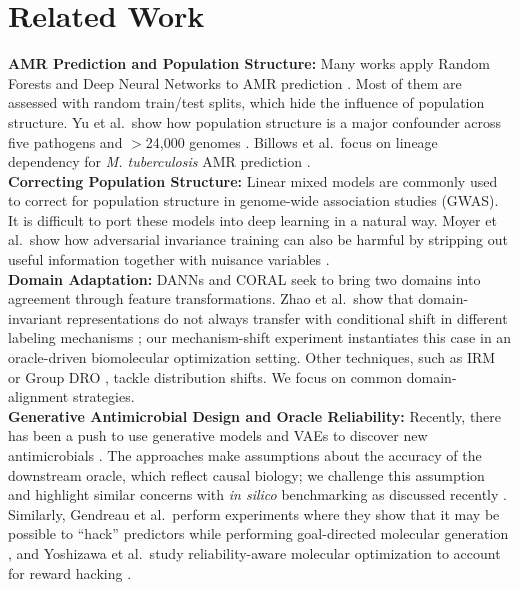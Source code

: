\documentclass{article}
\begin{document}
\section{Related Work}
\textbf{AMR Prediction and Population Structure:} Many works apply Random Forests and Deep Neural Networks to AMR prediction \cite{moradigaravand2018prediction}. Most of them are assessed with random train/test splits, which hide the influence of population structure. Yu et al.\ show how population structure is a major confounder across five pathogens and $>$24,000 genomes \cite{yu2025population}. Billows et al.\ focus on lineage dependency for \textit{M. tuberculosis} AMR prediction \cite{billows2023mtb}. \\
\textbf{Correcting Population Structure:} Linear mixed models \cite{earle2016identifying, lees2018pyseer} are commonly used to correct for population structure in genome-wide association studies (GWAS). It is difficult to port these models into deep learning in a natural way. Moyer et al.\ show how adversarial invariance training can also be harmful by stripping out useful information together with nuisance variables \cite{moyer2018invariant}. \\
\textbf{Domain Adaptation:} DANNs \cite{ganin2016domain} and CORAL \cite{sun2016deep} seek to bring two domains into agreement through feature transformations. Zhao et al.\ show that domain-invariant representations do not always transfer with conditional shift in different labeling mechanisms \cite{zhao2019learning}; our mechanism-shift experiment instantiates this case in an oracle-driven biomolecular optimization setting. Other techniques, such as IRM \cite{arjovsky2019invariant} or Group DRO \cite{sagawa2019distributionally}, tackle distribution shifts. We focus on common domain-alignment strategies. \\
\textbf{Generative Antimicrobial Design and Oracle Reliability:} Recently, there has been a push to use generative models and VAEs to discover new antimicrobials \cite{das2021accelerated, szymczak2023hydramp}. The approaches make assumptions about the accuracy of the downstream oracle, which reflect causal biology; we challenge this assumption and highlight similar concerns with \textit{in silico} benchmarking as discussed recently \cite{anon2025overconfident}. Similarly, Gendreau et al.\ perform experiments where they show that it may be possible to ``hack'' predictors while performing goal-directed molecular generation \cite{gendreau2023assays}, and Yoshizawa et al.\ study reliability-aware molecular optimization to account for reward hacking \cite{yoshizawa2025dyramo}.
\end{document}
